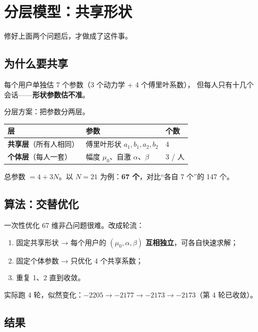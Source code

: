 \documentclass[UTF8,a4paper,11pt]{ctexart}
\begin{document}
\newpage


\section{分层模型：共享形状}

修好上面两个问题后，才做成了这件事。

\subsection{为什么要共享}

每个用户单独估 7 个参数（3 个动力学 + 4 个傅里叶系数），
但每人只有十几个会话——\textbf{形状参数估不准}。

分层方案：把参数分两层。

\begin{center}
\begin{tabular}{p{3.6cm}p{5.4cm}p{5.0cm}}
\toprule
\textbf{层} & \textbf{参数} & \textbf{个数} \\
\midrule
\textbf{共享层}（所有人相同） & 傅里叶形状 $a_1,b_1,a_2,b_2$ & 4 \\
\textbf{个体层}（每人一套） & 幅度 $\mu_0$、自激 $\alpha$、$\beta$ & 3 / 人 \\
\bottomrule
\end{tabular}
\end{center}

总参数 $= 4 + 3N$。以 $N=21$ 为例：\textbf{67 个}，对比“各自 7 个”的 147 个。

\subsection{算法：交替优化}

一次性优化 67 维非凸问题很难。改成轮流：

\begin{enumerate}[leftmargin=2em]
\item 固定共享形状 → 每个用户的 $(\mu_0,\alpha,\beta)$ \textbf{互相独立}，可各自快速求解；
\item 固定个体参数 → 只优化 4 个共享系数；
\item 重复 1、2 直到收敛。
\end{enumerate}

实际跑 4 轮，似然变化：$-2205 \to -2177 \to -2173 \to -2173$（第 4 轮已收敛）。

\subsection{结果}
\end{document}
